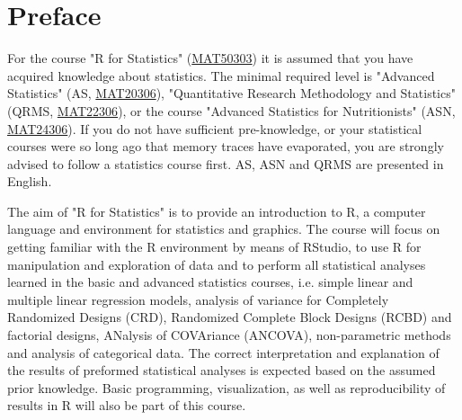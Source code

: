 \newpage

\pagestyle{empty}

\graphicspath{{images/}}

\chapter*{Preface}\label{preface}


\noindent For the course "R for Statistics" (\href{https://wur.osiris-student.nl/#/onderwijscatalogus/extern/cursus?cursuscode=MAT50303&collegejaar=huidig}{MAT50303}) it is assumed that you have acquired knowledge about statistics. The minimal required level is "Advanced Statistics" (AS, \href{https://wur.osiris-student.nl/#/onderwijscatalogus/extern/cursus?cursuscode=MAT20306&collegejaar=huidig}{MAT20306}), "Quantitative Research Methodology and Statistics" (QRMS, \href{https://wur.osiris-student.nl/#/onderwijscatalogus/extern/cursus?cursuscode=MAT22306&collegejaar=huidig}{MAT22306}), or the course "Advanced Statistics for Nutritionists" (ASN, \href{https://wur.osiris-student.nl/#/onderwijscatalogus/extern/cursus?cursuscode=MAT24306&collegejaar=huidig}{MAT24306}). If you do not have sufficient pre-knowledge, or your statistical courses were so long ago that memory traces have evaporated, you are strongly advised to follow a statistics course first. AS, ASN and QRMS are presented in English.

The aim of "R for Statistics" is to provide an introduction to R, a computer language and environment for statistics and graphics. The course will focus on getting familiar with the R environment by means of RStudio, to use R for manipulation and exploration of data and to perform all statistical analyses learned in the basic and advanced statistics courses, i.e. simple linear and multiple linear regression models, analysis of variance for Completely Randomized Designs (CRD), Randomized Complete Block Designs (RCBD) and factorial designs, ANalysis of COVAriance (ANCOVA), non-parametric methods and analysis of categorical data. The correct interpretation and explanation of the results of preformed statistical analyses is expected based on the assumed prior knowledge. Basic programming, visualization, as well as reproducibility of results in R will also be part of this course.

